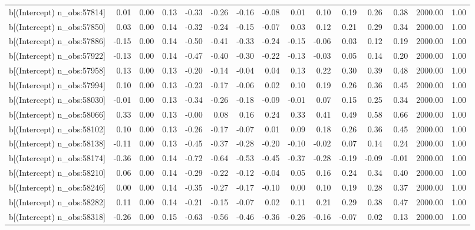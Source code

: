 \begin{table}[ht]
\begin{tabular}{rrrrrrrrrrrrrrr}
  b[(Intercept) n\_obs:57814] & 0.01 & 0.00 & 0.13 & -0.33 & -0.26 & -0.16 & -0.08 & 0.01 & 0.10 & 0.19 & 0.26 & 0.38 & 2000.00 & 1.00 \\ 
  b[(Intercept) n\_obs:57850] & 0.03 & 0.00 & 0.14 & -0.32 & -0.24 & -0.15 & -0.07 & 0.03 & 0.12 & 0.21 & 0.29 & 0.34 & 2000.00 & 1.00 \\ 
  b[(Intercept) n\_obs:57886] & -0.15 & 0.00 & 0.14 & -0.50 & -0.41 & -0.33 & -0.24 & -0.15 & -0.06 & 0.03 & 0.12 & 0.19 & 2000.00 & 1.00 \\ 
  b[(Intercept) n\_obs:57922] & -0.13 & 0.00 & 0.14 & -0.47 & -0.40 & -0.30 & -0.22 & -0.13 & -0.03 & 0.05 & 0.14 & 0.20 & 2000.00 & 1.00 \\ 
  b[(Intercept) n\_obs:57958] & 0.13 & 0.00 & 0.13 & -0.20 & -0.14 & -0.04 & 0.04 & 0.13 & 0.22 & 0.30 & 0.39 & 0.48 & 2000.00 & 1.00 \\ 
  b[(Intercept) n\_obs:57994] & 0.10 & 0.00 & 0.13 & -0.23 & -0.17 & -0.06 & 0.02 & 0.10 & 0.19 & 0.26 & 0.36 & 0.45 & 2000.00 & 1.00 \\ 
  b[(Intercept) n\_obs:58030] & -0.01 & 0.00 & 0.13 & -0.34 & -0.26 & -0.18 & -0.09 & -0.01 & 0.07 & 0.15 & 0.25 & 0.34 & 2000.00 & 1.00 \\ 
  b[(Intercept) n\_obs:58066] & 0.33 & 0.00 & 0.13 & -0.00 & 0.08 & 0.16 & 0.24 & 0.33 & 0.41 & 0.49 & 0.58 & 0.66 & 2000.00 & 1.00 \\ 
  b[(Intercept) n\_obs:58102] & 0.10 & 0.00 & 0.13 & -0.26 & -0.17 & -0.07 & 0.01 & 0.09 & 0.18 & 0.26 & 0.36 & 0.45 & 2000.00 & 1.00 \\ 
  b[(Intercept) n\_obs:58138] & -0.11 & 0.00 & 0.13 & -0.45 & -0.37 & -0.28 & -0.20 & -0.10 & -0.02 & 0.07 & 0.14 & 0.24 & 2000.00 & 1.00 \\ 
  b[(Intercept) n\_obs:58174] & -0.36 & 0.00 & 0.14 & -0.72 & -0.64 & -0.53 & -0.45 & -0.37 & -0.28 & -0.19 & -0.09 & -0.01 & 2000.00 & 1.00 \\ 
  b[(Intercept) n\_obs:58210] & 0.06 & 0.00 & 0.14 & -0.29 & -0.22 & -0.12 & -0.04 & 0.05 & 0.16 & 0.24 & 0.34 & 0.40 & 2000.00 & 1.00 \\ 
  b[(Intercept) n\_obs:58246] & 0.00 & 0.00 & 0.14 & -0.35 & -0.27 & -0.17 & -0.10 & 0.00 & 0.10 & 0.19 & 0.28 & 0.37 & 2000.00 & 1.00 \\ 
  b[(Intercept) n\_obs:58282] & 0.11 & 0.00 & 0.14 & -0.21 & -0.15 & -0.07 & 0.02 & 0.11 & 0.21 & 0.29 & 0.38 & 0.47 & 2000.00 & 1.00 \\ 
  b[(Intercept) n\_obs:58318] & -0.26 & 0.00 & 0.15 & -0.63 & -0.56 & -0.46 & -0.36 & -0.26 & -0.16 & -0.07 & 0.02 & 0.13 & 2000.00 & 1.00 \\ 

\end{tabular}
\end{table}
